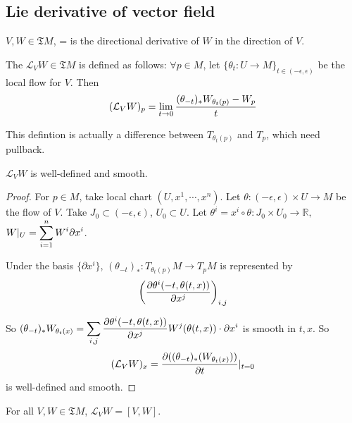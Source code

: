 \subsection{Lie derivative of vector field}
 $ V,W\in \mathfrak{T}M $,  = is the directional derivative of  $ W $ in the direction of  $ V $.
 \begin{definition}
    The   $ \mathcal{L}_VW\in \mathfrak{T}M $ is defined as follows: $ \forall p\in M $, let  $ \{\theta_t:U\rightarrow M\}_{t\in (-\epsilon,\epsilon)} $ be the local flow for  $ V $. Then  \[\displaystyle (\mathcal{L}_VW)_p=\lim\limits_{t\to 0}\frac{(\theta_{-t})_*W_{\theta_t(p)}-W_p}{t} \]    
 \end{definition}
\begin{remark}
    This defintion is actually a difference between  $ T_{\theta_t(p)} $ and  $ T_p $, which need pullback.  
\end{remark}
 \begin{lemma}
     $ \mathcal{L}_VW $ is well-defined  and smooth.
 \end{lemma}    
\begin{proof}
    For  $ p\in M $, take local chart  $ (U,x^1,\cdots,x^n) $. Let  $ \theta :(-\epsilon,\epsilon)\times U\rightarrow M $ be the flow of  $ V $. Take  $ J_0\subset(-\epsilon,\epsilon) $,  $ U_0\subset U $. Let  $ \theta ^i=x^i\circ \theta:J_0\times U_0\rightarrow \mathbb{R} ,  $   $ \displaystyle W|_U=\sum\limits_{i=1}^nW^i\partial x^i $.    
    
    Under the basis  $ \{\partial x^i\} $,  $ (\theta_{-t})_*:T_{\theta_t(p)}M\rightarrow T_pM $ is represented by 
    \[ \left(\displaystyle\frac{\partial \theta^i(-t,\theta(t,x))}{\partial x^j}\right)_{i,j}\]
    
    So  $ \displaystyle(\theta_{-t})_*W_{\theta_t(x)}=\sum\limits_{i,j}\frac{\partial \theta^i(-t,\theta(t,x))}{\partial x^j}W^j(\theta(t,x))\cdot \partial x^i $ is smooth in  $ t,x $.
    So 
    \[(\mathcal{L}_VW)_x=\displaystyle\frac{\partial ((\theta_{-t})_*(W_{\theta_t(x)}))}{\partial t}|_{t=0}\] is well-defined and smooth.  
\end{proof}
 \begin{theorem}
    For all  $ V,W\in \mathfrak{T}M $,  $ \mathcal{L}_VW=[V,W] $.  
 \end{theorem}
